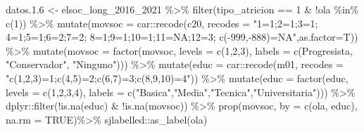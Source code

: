 \documentclass[
  12pt,
]{book}
\newenvironment{Shaded}{\begin{snugshade}}{\end{snugshade}}
\newcommand{\AttributeTok}[1]{\textcolor[rgb]{0.77,0.63,0.00}{#1}}
\newcommand{\ConstantTok}[1]{\textcolor[rgb]{0.00,0.00,0.00}{#1}}
\newcommand{\DecValTok}[1]{\textcolor[rgb]{0.00,0.00,0.81}{#1}}
\newcommand{\FloatTok}[1]{\textcolor[rgb]{0.00,0.00,0.81}{#1}}
\newcommand{\FunctionTok}[1]{\textcolor[rgb]{0.00,0.00,0.00}{#1}}
\newcommand{\NormalTok}[1]{#1}
\newcommand{\OtherTok}[1]{\textcolor[rgb]{0.56,0.35,0.01}{#1}}
\newcommand{\SpecialCharTok}[1]{\textcolor[rgb]{0.00,0.00,0.00}{#1}}
\newcommand{\StringTok}[1]{\textcolor[rgb]{0.31,0.60,0.02}{#1}}
\begin{document}
\begin{Shaded}
\begin{Highlighting}[]
\NormalTok{datos.}\FloatTok{1.6} \OtherTok{\textless{}{-}}\NormalTok{ elsoc\_long\_2016\_2021 }\SpecialCharTok{\%\textgreater{}\%}
  \FunctionTok{filter}\NormalTok{(tipo\_atricion }\SpecialCharTok{==} \DecValTok{1} \SpecialCharTok{\&} \SpecialCharTok{!}\NormalTok{ola }\SpecialCharTok{\%in\%} \FunctionTok{c}\NormalTok{(}\DecValTok{1}\NormalTok{)) }\SpecialCharTok{\%\textgreater{}\%}
   \FunctionTok{mutate}\NormalTok{(}\AttributeTok{movsoc =}\NormalTok{ car}\SpecialCharTok{::}\FunctionTok{recode}\NormalTok{(c20, }\AttributeTok{recodes =} \StringTok{"1=\textquotesingle{}1\textquotesingle{};2=\textquotesingle{}1\textquotesingle{};3=\textquotesingle{}1\textquotesingle{};}
\StringTok{                                          4=\textquotesingle{}1\textquotesingle{};5=\textquotesingle{}1\textquotesingle{};6=\textquotesingle{}2\textquotesingle{};7=\textquotesingle{}2\textquotesingle{};}
\StringTok{                                          8=\textquotesingle{}1\textquotesingle{};9=\textquotesingle{}1\textquotesingle{};10=\textquotesingle{}1\textquotesingle{};11=NA;12=\textquotesingle{}3\textquotesingle{};}
\StringTok{                                          c({-}999,{-}888)=NA"}\NormalTok{,}\AttributeTok{as.factor=}\NormalTok{T)) }\SpecialCharTok{\%\textgreater{}\%} 
   \FunctionTok{mutate}\NormalTok{(}\AttributeTok{movsoc =} \FunctionTok{factor}\NormalTok{(movsoc, }\AttributeTok{levels =} \FunctionTok{c}\NormalTok{(}\DecValTok{1}\NormalTok{,}\DecValTok{2}\NormalTok{,}\DecValTok{3}\NormalTok{),}
                         \AttributeTok{labels =} \FunctionTok{c}\NormalTok{(}\StringTok{\textquotesingle{}Progresista\textquotesingle{}}\NormalTok{, }\StringTok{"Conservador"}\NormalTok{, }\StringTok{"Ninguno"}\NormalTok{))) }\SpecialCharTok{\%\textgreater{}\%}
  \FunctionTok{mutate}\NormalTok{(}\AttributeTok{educ =}\NormalTok{ car}\SpecialCharTok{::}\FunctionTok{recode}\NormalTok{(m01, }\AttributeTok{recodes =} \StringTok{"c(1,2,3)=1;c(4,5)=2;c(6,7)=3;c(8,9,10)=4"}\NormalTok{)) }\SpecialCharTok{\%\textgreater{}\%}
  \FunctionTok{mutate}\NormalTok{(}\AttributeTok{educ =} \FunctionTok{factor}\NormalTok{(educ, }\AttributeTok{levels =} \FunctionTok{c}\NormalTok{(}\DecValTok{1}\NormalTok{,}\DecValTok{2}\NormalTok{,}\DecValTok{3}\NormalTok{,}\DecValTok{4}\NormalTok{),}
                         \AttributeTok{labels =} \FunctionTok{c}\NormalTok{(}\StringTok{"Basica"}\NormalTok{,}\StringTok{"Media"}\NormalTok{,}\StringTok{"Tecnica"}\NormalTok{,}\StringTok{"Universitaria"}\NormalTok{))) }\SpecialCharTok{\%\textgreater{}\%}
\NormalTok{    dplyr}\SpecialCharTok{::}\FunctionTok{filter}\NormalTok{(}\SpecialCharTok{!}\FunctionTok{is.na}\NormalTok{(educ) }\SpecialCharTok{\&} \SpecialCharTok{!}\FunctionTok{is.na}\NormalTok{(movsoc)) }\SpecialCharTok{\%\textgreater{}\%}
  \FunctionTok{prop}\NormalTok{(movsoc, }\AttributeTok{by  =} \FunctionTok{c}\NormalTok{(ola, educ), }\AttributeTok{na.rm =} \ConstantTok{TRUE}\NormalTok{)}\SpecialCharTok{\%\textgreater{}\%} 
\NormalTok{  sjlabelled}\SpecialCharTok{::}\FunctionTok{as\_label}\NormalTok{(ola)}
  

\end{Highlighting}
\end{Shaded}
\end{document}
